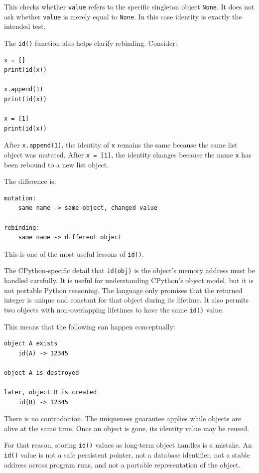 This checks whether \texttt{value} refers to the specific singleton object \texttt{None}. It does not ask whether \texttt{value} is merely equal to \texttt{None}. In this case identity is exactly the intended test.

The \texttt{id()} function also helps clarify rebinding. Consider:

\begin{verbatim}
x = []
print(id(x))

x.append(1)
print(id(x))

x = [1]
print(id(x))
\end{verbatim}

After \texttt{x.append(1)}, the identity of \texttt{x} remains the same because the same list object was mutated. After \texttt{x = [1]}, the identity changes because the name \texttt{x} has been rebound to a new list object.

The difference is:

\begin{verbatim}
mutation:
    same name -> same object, changed value

rebinding:
    same name -> different object
\end{verbatim}

This is one of the most useful lessons of \texttt{id()}.

The CPython-specific detail that \texttt{id(obj)} is the object's memory address must be handled carefully. It is useful for understanding CPython's object model, but it is not portable Python reasoning. The language only promises that the returned integer is unique and constant for that object during its lifetime. It also permits two objects with non-overlapping lifetimes to have the same \texttt{id()} value. \cite{python_builtin_id}

This means that the following can happen conceptually:

\begin{verbatim}
object A exists
    id(A) -> 12345

object A is destroyed

later, object B is created
    id(B) -> 12345
\end{verbatim}

There is no contradiction. The uniqueness guarantee applies while objects are alive at the same time. Once an object is gone, its identity value may be reused.

For that reason, storing \texttt{id()} values as long-term object handles is a mistake. An \texttt{id()} value is not a safe persistent pointer, not a database identifier, not a stable address across program runs, and not a portable representation of the object.

